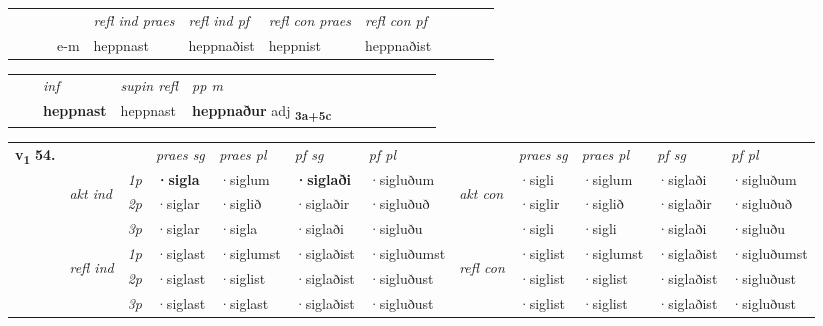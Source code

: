 \begin{tabular}{llllllllllll}
 & &  & &  \textit{refl ind praes} & \textit{refl ind pf} & \textit{refl con praes} & \textit{refl con pf} \\*
&  & & e-m & heppnast & heppnaðist & heppnist & heppnaðist \\*
\cmidrule{5-9}
\end{tabular}


\begin{tabular}{llllllllllll}
 & & \textit{inf}       & \textit{supin refl} & \textit{pp m}     \\*
  & & \textbf{heppnast}        & heppnast & \textbf{heppnaður} adj \textbf{\textsubscript{3a+5c}} \\*
\cmidrule{1-12}
\end{tabular}



\begin{tabular}{llllllllllll} \toprule
\multirow{4}{*}{{{\textbf{v{\textsubscript{1}}} \Large{\textbf{54.}}}}}  & &   &  \textit{praes sg}  & \textit{praes pl}  &\textit{ pf sg} & \textit{pf pl} &  &  \textit{praes sg}  & \textit{praes pl}  & \textit{pf sg} & \textit{pf pl } \\*
	\cmidrule{4-7} \cmidrule{9-12}
 & \multirow{3}{*}{\begin{turn}{90}\textit{akt ind}\end{turn}} & {\textit{1p}} & \textbf{·sigla} & ·siglum    & \textbf{·siglaði} & ·sigluðum & \multirow{3}{*}{\begin{turn}{90}\textit{akt con}\end{turn}} &·sigli & ·siglum & ·siglaði & ·sigluðum\\*
& &  {\textit{2p}} &  ·siglar  & ·siglið   & ·siglaðir & ·sigluðuð & & ·siglir & ·siglið & ·siglaðir & ·sigluðuð \\*
& &  {\textit{3p}} & ·siglar & ·sigla   & ·siglaði & ·sigluðu & & ·sigli & ·sigli& ·siglaði & ·sigluðu  \\*
\cmidrule{4-7} \cmidrule{9-12}
 &\multirow{3}{*}{\begin{turn}{90}\textit{refl ind}\end{turn}} & {\textit{1p}} & ·siglast & ·siglumst    & ·siglaðist & ·sigluðumst & \multirow{3}{*}{\begin{turn}{90}\textit{refl con}\end{turn}}  &·siglist & ·siglumst & ·siglaðist & ·sigluðumst\\*
 &&  {\textit{2p}} &  ·siglast  & ·siglist   & ·siglaðist & ·sigluðust & &·siglist & ·siglist & ·siglaðist & ·sigluðust \\*
& &  {\textit{3p}} & ·siglast & ·siglast   & ·siglaðist & ·sigluðust & & ·siglist & ·siglist& ·siglaðist & ·sigluðust  \\*
\cmidrule{4-7} \cmidrule{9-12}
\end{tabular}


